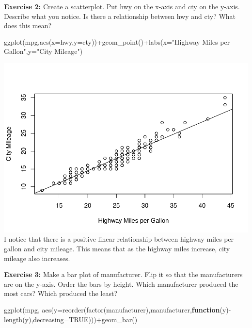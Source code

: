 \documentclass[
]{article}
\newenvironment{Shaded}{\begin{snugshade}}{\end{snugshade}}
\newcommand{\AttributeTok}[1]{\textcolor[rgb]{0.77,0.63,0.00}{#1}}
\newcommand{\ConstantTok}[1]{\textcolor[rgb]{0.00,0.00,0.00}{#1}}
\newcommand{\ControlFlowTok}[1]{\textcolor[rgb]{0.13,0.29,0.53}{\textbf{#1}}}
\newcommand{\FunctionTok}[1]{\textcolor[rgb]{0.00,0.00,0.00}{#1}}
\newcommand{\NormalTok}[1]{#1}
\newcommand{\SpecialCharTok}[1]{\textcolor[rgb]{0.00,0.00,0.00}{#1}}
\newcommand{\StringTok}[1]{\textcolor[rgb]{0.31,0.60,0.02}{#1}}
\begin{document}
\textbf{Exercise 2:} Create a scatterplot. Put hwy on the x-axis and cty
on the y-axis. Describe what you notice. Is there a relationship between
hwy and cty? What does this mean?

\begin{Shaded}
\begin{Highlighting}[]
\FunctionTok{ggplot}\NormalTok{(mpg,}\FunctionTok{aes}\NormalTok{(}\AttributeTok{x=}\NormalTok{hwy,}\AttributeTok{y=}\NormalTok{cty))}\SpecialCharTok{+}\FunctionTok{geom\_point}\NormalTok{()}\SpecialCharTok{+}\FunctionTok{labs}\NormalTok{(}\AttributeTok{x=}\StringTok{"Highway Miles per Gallon"}\NormalTok{,}\AttributeTok{y=}\StringTok{"City Mileage"}\NormalTok{)}
\end{Highlighting}
\end{Shaded}

\includegraphics{PSTAT131-HW1_files/figure-latex/unnamed-chunk-2-1.pdf}
I notice that there is a positive linear relationship between highway
miles per gallon and city mileage. This means that as the highway miles
increase, city mileage also increases.

\textbf{Exercise 3:} Make a bar plot of manufacturer. Flip it so that
the manufacturers are on the y-axis. Order the bars by height. Which
manufacturer produced the most cars? Which produced the least?

\begin{Shaded}
\begin{Highlighting}[]
\FunctionTok{ggplot}\NormalTok{(mpg, }\FunctionTok{aes}\NormalTok{(}\AttributeTok{y=}\FunctionTok{reorder}\NormalTok{(}\FunctionTok{factor}\NormalTok{(manufacturer),manufacturer,}\ControlFlowTok{function}\NormalTok{(y)}\SpecialCharTok{{-}}\FunctionTok{length}\NormalTok{(y),}\AttributeTok{decreasing=}\ConstantTok{TRUE}\NormalTok{)))}\SpecialCharTok{+}\FunctionTok{geom\_bar}\NormalTok{() }
\end{Highlighting}
\end{Shaded}
\end{document}
